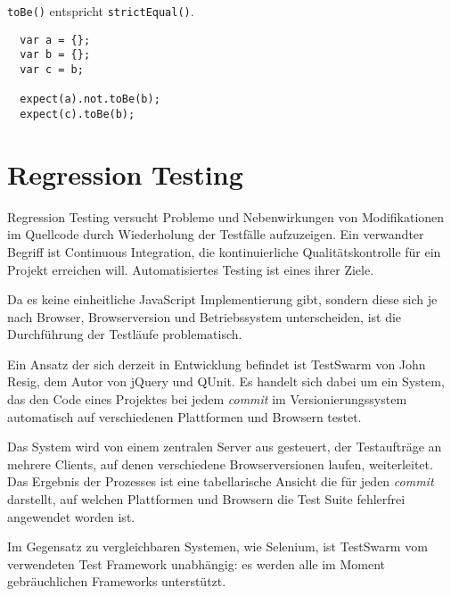 \documentclass[11pt, a4paper]{article}
\begin{document}
\texttt{toBe()} entspricht \texttt{strictEqual()}.

\begin{verbatim}
  var a = {};
  var b = {};
  var c = b;

  expect(a).not.toBe(b);
  expect(c).toBe(b);
\end{verbatim}

\section{Regression Testing}

Regression Testing\cite{wikipedia_regression_2011} versucht Probleme und
Nebenwirkungen von Modifikationen im Quellcode durch Wiederholung der Testfälle
aufzuzeigen. Ein verwandter Begriff ist Continuous
Integration\cite{wikipedia_continuous_2011}, die kontinuierliche
Qualitätskontrolle für ein Projekt erreichen will. Automatisiertes Testing ist
eines ihrer Ziele. 

Da es keine einheitliche JavaScript Implementierung gibt, sondern
diese sich je nach Browser, Browserversion und Betriebssystem unterscheiden, ist
die Durchführung der Testläufe problematisch.

Ein Ansatz der sich derzeit in Entwicklung befindet ist
TestSwarm\cite{resig_testswarm_2011} von John Resig, dem Autor von jQuery und
QUnit. Es handelt sich dabei um ein System, das den Code eines Projektes bei
jedem \emph{commit} im Versionierungssystem automatisch auf verschiedenen
Plattformen und Browsern testet.

Das System wird von einem zentralen Server aus gesteuert, der Testaufträge an
mehrere Clients, auf denen verschiedene Browserversionen laufen, weiterleitet.
Das Ergebnis der Prozesses ist eine tabellarische Ansicht die für jeden
\emph{commit} darstellt, auf welchen Plattformen und Browsern die Test Suite
fehlerfrei angewendet worden ist.

Im Gegensatz zu vergleichbaren Systemen, wie
Selenium\cite{selenium_selenium_2011}, ist TestSwarm vom verwendeten Test
Framework unabhängig: es werden alle im Moment gebräuchlichen Frameworks
unterstützt.

\begin{flushleft}
  
  
\end{flushleft}
\end{document}
